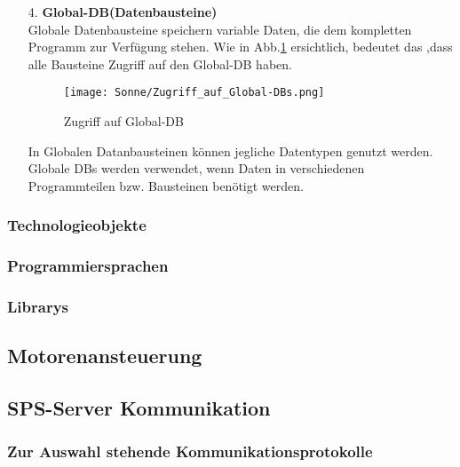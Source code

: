 \begin{itemize}
        \item[4.]   \textbf{Global-DB(Datenbausteine)} \\
            Globale Datenbausteine speichern variable Daten, die dem kompletten Programm zur Verfügung stehen. Wie in Abb.\ref{Zugriff auf Global-DB} ersichtlich, bedeutet das ,dass alle Bausteine Zugriff auf den Global-DB haben.

            \begin{figure}[h]
                \centering
                \texttt{[image: Sonne/Zugriff\_auf\_Global-DBs.png]}
                \caption{Zugriff auf Global-DB \cite{Programmierleitfaden_für_S7-1500}}
                \label{Zugriff auf Global-DB}
            \end{figure}

            In Globalen Datanbausteinen können jegliche Datentypen genutzt werden.\\
            Globale DBs werden verwendet, wenn Daten in verschiedenen Programmteilen bzw. Bausteinen benötigt werden.
            \cite{Programmierleitfaden_für_S7-1500}
    \end{itemize}

    \subsubsection{Technologieobjekte}

    \subsubsection{Programmiersprachen}

    \subsubsection{Librarys}
    \label{Libraryeinbindung}

\subsection{Motorenansteuerung}

\subsection{SPS-Server Kommunikation}

    \subsubsection{Zur Auswahl stehende Kommunikationsprotokolle} 
    \label{Kommunikationsprotokolle}

